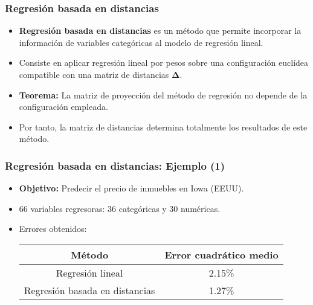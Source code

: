 \documentclass{beamer}
\begin{document}
\begin{frame}
\frametitle{Regresión basada en distancias}

\begin{itemize}
    \item \textbf{Regresión basada en distancias} es un método que permite incorporar la información de variables categóricas al modelo de regresión lineal.
    \item Consiste en aplicar regresión lineal por pesos sobre una configuración euclídea compatible con una matriz de distancias $\boldsymbol{\Delta}$.
    \item \textbf{Teorema:} La matriz de proyección del método de regresión no depende de la configuración empleada.
    \item Por tanto, la matriz de distancias determina totalmente los resultados de este método.
\end{itemize}

\end{frame}

\begin{frame}
\frametitle{Regresión basada en distancias: Ejemplo (1)}

\begin{itemize}
    \item \textbf{Objetivo:} Predecir el precio de inmuebles en Iowa (EEUU).
    \item 66 variables regresoras: 36 categóricas y 30 numéricas.
    \item Errores obtenidos:
    \vspace{10pt}
    \begin{table}[H]
    \centering
    \begin{tabular}{|c|c|}
    \hline
    \textbf{Método}                                       & \textbf{Error cuadrático medio} \\ \hline
    {\color[HTML]{000000} Regresión lineal}               & 2.15\%                          \\ \hline
    {\color[HTML]{000000} Regresión basada en distancias} & 1.27\%                          \\ \hline
    \end{tabular}
    \end{table}
\end{itemize}

\end{frame}
\end{document}
